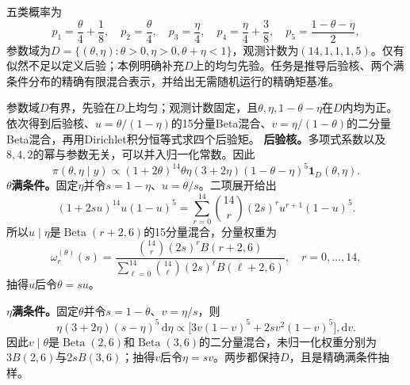 \label{struct:V5-C04-CH32}
\begin{example}[五分类模型的可复算Gibbs目标]\label{exm:V5-C04-five-category}
五类概率为
\[
p_1=\frac\theta4+\frac18,
\quad p_2=\frac\theta4,
\quad p_3=\frac\eta4,
\quad p_4=\frac\eta4+\frac38,
\quad p_5=\frac{1-\theta-\eta}{2},
\]
参数域为$D=\{(\theta,\eta):\theta>0,\eta>0,\theta+\eta<1\}$，观测计数为$(14,1,1,1,5)$。仅有似然不足以定义后验；本例明确补充$D$上的均匀先验。任务是推导后验核、两个满条件分布的精确有限混合表示，并给出无需随机运行的精确矩基准。
\end{example}

\label{struct:V5-C04-CH33}
\begin{solution}
\SolGiven 参数域$D$有界，先验在$D$上均匀；观测计数固定，且$\theta,\eta,1-\theta-\eta$在$D$内均为正。
\SolPlan 依次得到后验核、$u=\theta/(1-\eta)$的15分量Beta混合、$v=\eta/(1-\theta)$的二分量Beta混合，再用Dirichlet积分恒等式求四个后验矩。
\SolDerive
\textbf{后验核。}多项式系数以及$8,4,2$的幂与参数无关，可以并入归一化常数。因此
\begin{equation}\label{eq:V5-C04-five-posterior}
\pi(\theta,\eta\mid y)
\propto
(1+2\theta)^{14}\theta\eta(3+2\eta)
(1-\theta-\eta)^5\mathbf 1_D(\theta,\eta).
\end{equation}
\textbf{$\theta$满条件。}固定$\eta$并令$s=1-\eta$、$u=\theta/s$。二项展开给出
\[
(1+2su)^{14}u(1-u)^5
=\sum_{r=0}^{14}\binom{14}{r}(2s)^r
u^{r+1}(1-u)^5.
\]
所以$u\mid\eta$是$\operatorname{Beta}(r+2,6)$的15分量混合，分量权重为
\begin{equation}\label{eq:V5-C04-theta-mixture}
\omega_r^{(\theta)}(s)
=\frac{\binom{14}{r}(2s)^r B(r+2,6)}
{\sum_{\ell=0}^{14}\binom{14}{\ell}(2s)^\ell B(\ell+2,6)},
\quad r=0,\ldots,14,
\end{equation}
抽得$u$后令$\theta=su$。

\textbf{$\eta$满条件。}固定$\theta$并令$s=1-\theta$、$v=\eta/s$，则
\[
\eta(3+2\eta)(s-\eta)^5\,\mathrm d\eta
\propto
\bigl[3v(1-v)^5+2s v^2(1-v)^5\bigr],\mathrm dv.
\]
因此$v\mid\theta$是$\operatorname{Beta}(2,6)$和$\operatorname{Beta}(3,6)$的二分量混合，未归一化权重分别为$3B(2,6)$与$2sB(3,6)$；抽得$v$后令$\eta=sv$。两步都保持$D$，且是精确满条件抽样。


\end{solution}
